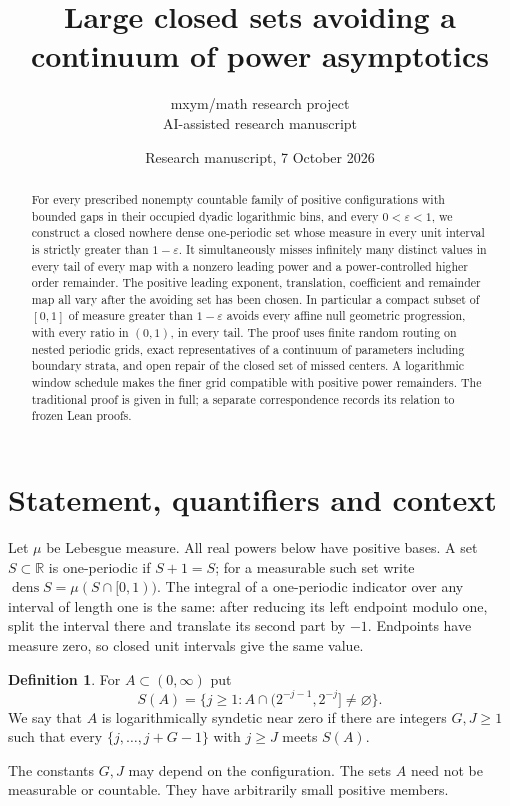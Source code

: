 \documentclass[11pt]{article}
\title{Large closed sets avoiding a continuum of power asymptotics}
\author{mxym/math research project\\AI-assisted research manuscript}
\date{Research manuscript, 7 October 2026}
\theoremstyle{definition}
\newtheorem{definition}[theorem]{Definition}
\theoremstyle{remark}
\newcommand{\R}{\mathbb R}
\newcommand{\dens}{\operatorname{dens}}
\begin{document}
\maketitle
\begin{abstract}
For every prescribed nonempty countable family of positive configurations with
bounded gaps in their occupied dyadic logarithmic bins, and every
$0<\varepsilon<1$, we construct a closed nowhere dense one-periodic set whose
measure in every unit interval is strictly greater than $1-\varepsilon$.
It simultaneously misses infinitely many distinct values in every tail of every
map with a nonzero leading power and a power-controlled higher order remainder.
The positive leading exponent, translation, coefficient and remainder map all
vary after the avoiding set has been chosen. In particular a compact subset of
$[0,1]$ of measure greater than $1-\varepsilon$ avoids every affine null geometric
progression, with every ratio in $(0,1)$, in every tail. The proof uses finite
random routing on nested periodic grids, exact representatives of a continuum
of parameters including boundary strata, and open repair of the closed set of
missed centers. A logarithmic window schedule makes the finer grid compatible
with positive power remainders. The traditional proof is given in full; a
separate correspondence records its relation to frozen Lean proofs.
\end{abstract}

\section{Statement, quantifiers and context}\label{sec:statement}
Let $\mu$ be Lebesgue measure. All real powers below have positive bases.
A set $S\subset\R$ is one-periodic if $S+1=S$; for a measurable such set write
$\dens S=\mu(S\cap[0,1))$. The integral of a one-periodic indicator over any
interval of length one is the same: after reducing its left endpoint modulo
one, split the interval there and translate its second part by $-1$.
Endpoints have measure zero, so closed unit intervals give the same value.

\begin{definition}\label{def:syndetic}
For $A\subset(0,\infty)$ put
\[
 S(A)=\{j\geq1:A\cap(2^{-j-1},2^{-j}]\ne\varnothing\}.
\]
We say that $A$ is logarithmically syndetic near zero if there are integers
$G,J\geq1$ such that every $\{j,\ldots,j+G-1\}$ with $j\geq J$ meets $S(A)$.
\end{definition}
The constants $G,J$ may depend on the configuration. The sets $A$ need not be
measurable or countable. They have arbitrarily small positive members.
\end{document}
